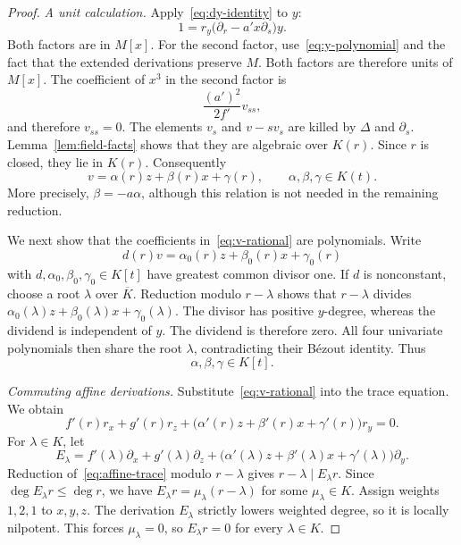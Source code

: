 \documentclass[10pt,a4paper]{amsart}
\begin{document}
\begin{proof}
\smallskip\noindent\emph{A unit calculation.}
Apply~\eqref{eq:dy-identity} to $y$:
\begin{equation}\label{eq:unit-identity}
 1=r_y\bigl(\partial_r-a'x\partial_s\bigr)y.
\end{equation}
Both factors are in $M[x]$. For the second factor, use~\eqref{eq:y-polynomial} and the fact that the extended derivations preserve $M$. Both factors are therefore units of $M[x]$. The coefficient of $x^3$ in the second factor is
\[
 \frac{(a')^2}{2f'}v_{ss},
\]
and therefore $v_{ss}=0$. The elements $v_s$ and $v-sv_s$ are killed by $\Delta$ and $\partial_s$. Lemma~\ref{lem:field-facts} shows that they are algebraic over $K(r)$. Since $r$ is closed, they lie in $K(r)$. Consequently
\begin{equation}\label{eq:v-rational}
 v=\alpha(r)z+\beta(r)x+\gamma(r),\qquad \alpha,\beta,\gamma\in K(t).
\end{equation}
More precisely, $\beta=-a\alpha$, although this relation is not needed in the remaining reduction.

We next show that the coefficients in~\eqref{eq:v-rational} are polynomials. Write
\[
 d(r)v=\alpha_0(r)z+\beta_0(r)x+\gamma_0(r)
\]
with $d,\alpha_0,\beta_0,\gamma_0\in K[t]$ have greatest common divisor one. If $d$ is nonconstant, choose a root $\lambda$ over $\overline K$. Reduction modulo $r-\lambda$ shows that $r-\lambda$ divides
$\alpha_0(\lambda)z+\beta_0(\lambda)x+\gamma_0(\lambda)$. The divisor has positive $y$-degree, whereas the dividend is independent of $y$. The dividend is therefore zero. All four univariate polynomials then share the root $\lambda$, contradicting their B\'ezout identity. Thus
\begin{equation}\label{eq:v-polynomial}
 \alpha,\beta,\gamma\in K[t].
\end{equation}

\smallskip\noindent\emph{Commuting affine derivations.}
Substitute~\eqref{eq:v-rational} into the trace equation. We obtain
\begin{equation}\label{eq:affine-trace}
 f'(r)r_x+g'(r)r_z+
 \bigl(\alpha'(r)z+\beta'(r)x+\gamma'(r)\bigr)r_y=0.
\end{equation}
For $\lambda\in K$, let
\[
 E_\lambda=f'(\lambda)\partial_x+g'(\lambda)\partial_z+
 \bigl(\alpha'(\lambda)z+\beta'(\lambda)x+\gamma'(\lambda)\bigr)\partial_y.
\]
Reduction of~\eqref{eq:affine-trace} modulo $r-\lambda$ gives $r-\lambda\mid E_\lambda r$. Since $\deg E_\lambda r\leq\deg r$, we have $E_\lambda r=\mu_\lambda(r-\lambda)$ for some $\mu_\lambda\in K$. Assign weights $1,2,1$ to $x,y,z$. The derivation $E_\lambda$ strictly lowers weighted degree, so it is locally nilpotent. This forces $\mu_\lambda=0$, so $E_\lambda r=0$ for every $\lambda\in K$.


\end{proof}
\end{document}
